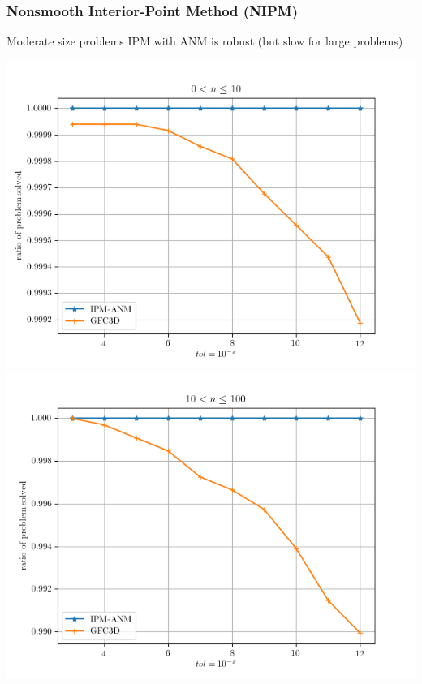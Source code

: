 \begin{frame}
  \frametitle{Nonsmooth Interior-Point Method (NIPM)}
  \begin{block}{Moderate size problems}
    IPM with ANM is robust (but slow for large problems)
  \end{block}
  \def\figheightanm{0.42}
  
  \begin{center}
    \includegraphics[height=\figheightanm\textheight]{./figure/IPM/anm_solver_performance_1_10.png}
    \includegraphics[height=\figheightanm\textheight]{./figure/IPM/anm_solver_performance_11_100.png}

\end{center}
\end{frame}
